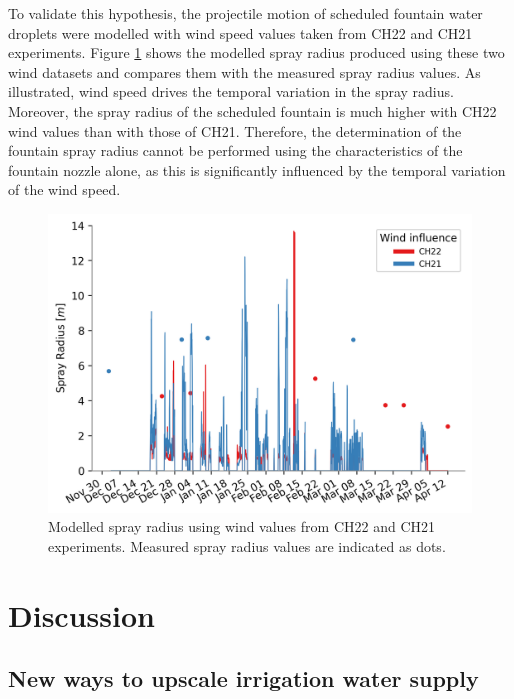 \documentclass[tc, manuscript]{copernicus}
\begin{document}
To validate this hypothesis, the projectile motion of scheduled fountain water droplets were modelled with wind
speed values taken from CH22 and CH21 experiments. Figure \ref{fig:wind} shows the modelled spray radius
produced using these two wind datasets and compares them with the measured spray radius values. As illustrated,
wind speed drives the temporal variation in the spray radius. Moreover, the spray radius of the scheduled
fountain is much higher with CH22 wind values than with those of CH21. Therefore, the determination of the
fountain spray radius cannot be performed using the characteristics of the fountain nozzle alone, as this is
significantly influenced by the temporal variation of the wind speed.

\begin{figure}[htb]
\includegraphics[width=12 cm]{Figures/radf.png}
\caption{Modelled spray radius using wind values from CH22 and CH21 experiments. Measured spray radius values are
indicated as dots.}
\label{fig:wind}
\end{figure}

\section{Discussion}

\subsection{New ways to upscale irrigation water supply}
\end{document}
